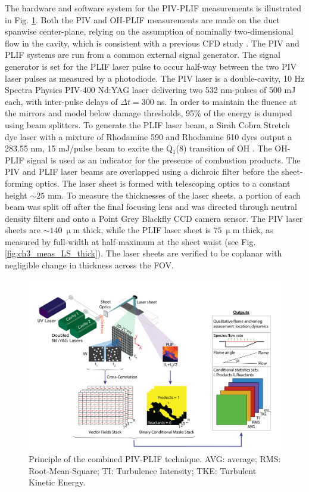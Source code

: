 The hardware and software system for the PIV-PLIF measurements is illustrated in Fig. \ref{fig:ch3_method_setup}. 
Both the PIV and OH-PLIF measurements are made on the duct spanwise center-plane, relying on the assumption of nominally two-dimensional flow in the cavity, which is consistent with a previous CFD study \cite{ramesh2015large}. The PIV and PLIF systems are run from a common external signal generator. The signal generator is set for the PLIF laser pulse to occur half-way between the two PIV laser pulses as measured by a photodiode. 
The PIV laser is a double-cavity, 10 Hz Spectra Physics PIV-400 Nd:YAG laser delivering two 532 nm-pulses of 500 mJ each, with inter-pulse delays of $\Delta t = 300$ ns. In order to maintain the fluence at the mirrors and model below damage thresholds, 95\% of the energy is dumped using beam splitters. To generate the PLIF laser beam, a Sirah Cobra Stretch dye laser with a mixture of Rhodamine 590 and Rhodamine 610 dyes output a 283.55 nm, 15 mJ/pulse beam to excite the Q$_1$(8) transition of OH \citep{GeipelRockwellChelliahEtAl2017}. The OH-PLIF signal is used as an indicator for the presence of combustion products. The PIV and PLIF laser beams are overlapped using a dichroic filter before the sheet-forming optics. The laser sheet is formed with telescoping optics to a constant height $\sim 25$ mm. To measure the thicknesses of the laser sheets, a portion of each beam was split off after the final focusing lens and was directed through neutral density filters and onto a Point Grey Blackfly CCD camera sensor. The PIV laser sheets are $\sim 140~ \mathrm{\upmu m}$ thick, while the PLIF laser sheet is $75~ \mathrm{\upmu m}$ thick, as measured by full-width at half-maximum at the sheet waist (see Fig. \ref{fig:ch3_meas_LS_thick}). The laser sheets are verified to be coplanar with negligible change in thickness across the FOV.
\begin{figure}
\centering
\includegraphics[width=6.5in, trim=0.6in 0in 0.7in 0in, clip]{figures/PIV-PLIFsetup/PIV-PLIFArtboard1@3x.png} %
\caption{Principle of the combined PIV-PLIF technique. AVG: average; RMS: Root-Mean-Square; TI: Turbulence Intensity; TKE: Turbulent Kinetic Energy.}\label{fig:ch3_method_setup}
\end{figure}

